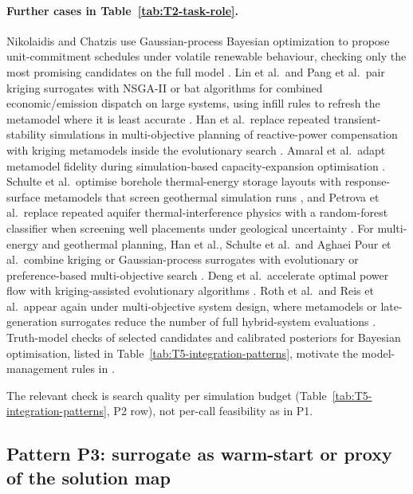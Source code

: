 \paragraph{Further cases in Table~\ref{tab:T2-task-role}.}
Nikolaidis and Chatzis use Gaussian-process Bayesian optimization to
propose unit-commitment schedules under volatile renewable behaviour,
checking only the most promising candidates on the full model
\cite{Nikolaidis2021}.
Lin et al.\ and Pang et al.\ pair kriging surrogates with NSGA-II or
bat algorithms for combined economic/emission dispatch on large systems,
using infill rules to refresh the metamodel where it is least accurate
\cite{Lin2023,Pang2023}.
Han et al.\ replace repeated transient-stability simulations in
multi-objective planning of reactive-power compensation with kriging
metamodels inside the evolutionary search \cite{Han2018622}.
Amaral et al.\ adapt metamodel fidelity during simulation-based
capacity-expansion optimisation \cite{Amaral20251156}.
Schulte et al.\ optimise borehole thermal-energy storage layouts with
response-surface metamodels that screen geothermal simulation runs
\cite{Schulte2016104}, and Petrova et al.\ replace repeated aquifer
thermal-interference physics with a random-forest classifier when
screening well placements under geological uncertainty
\cite{Petrova2025}.
For multi-energy and geothermal planning, Han et al., Schulte et al.\
and Aghaei Pour et al.\ combine kriging or Gaussian-process surrogates
with evolutionary or preference-based multi-objective search
\cite{Han2018622,Schulte2020,Aghaei Pour2022303}.
Deng et al.\ accelerate optimal power flow with kriging-assisted
evolutionary algorithms \cite{Deng2020831}.
Roth et al.\ and Reis et al.\ appear again under multi-objective system
design, where metamodels or late-generation surrogates reduce the number
of full hybrid-system evaluations \cite{Roth2019214,Reis2025}.
Truth-model checks of selected candidates and calibrated posteriors for
Bayesian optimisation, listed in Table~\ref{tab:T5-integration-patterns},
motivate the model-management rules in
\cite{Nikolaidis2021,Aghaei Pour2022303,Han2018622,Lin2023}.

The relevant check is search quality per simulation budget
(Table~\ref{tab:T5-integration-patterns}, P2 row), not per-call
feasibility as in P1.

\subsection{Pattern P3: surrogate as warm-start or proxy of the solution map}
\label{sec:int:warmstart}

